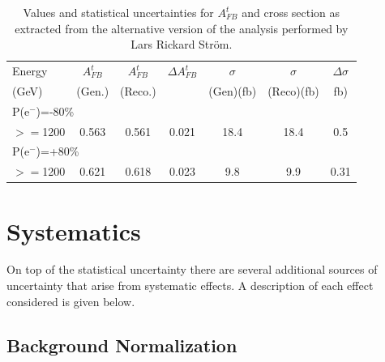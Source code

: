 \begin{table}
  \centering
  \begin{tabular}{l|c|c|c|c|c|c}
    \toprule
    Energy & $A_{FB}^t$ & $A_{FB}^t$  & $\Delta A^t_{FB}$ &  $\sigma$  &  $\sigma$  &  $\Delta\sigma$ \\
    (GeV) & (Gen.) & (Reco.) &  &  (Gen)(fb) &  (Reco)(fb) &  fb)\\
    \midrule
    \midrule
    \multicolumn{7}{l}{P(e$^-$)=-80\%} \\
    \midrule
    \midrule
    $>=$1200  & 0.563 & 0.561 & 0.021 & 18.4 & 18.4 & 0.5 \\
    \midrule
    \midrule
    \multicolumn{7}{l}{ P(e$^-$)=+80\%}\\
    \midrule
    \midrule
    $>=$1200  & 0.621 & 0.618 & 0.023 & 9.8 & 9.9 & 0.31 \\
    \bottomrule
  \end{tabular}
  \caption{Values and statistical uncertainties for $A_{FB}^t$ and cross section as extracted from the alternative version of the analysis performed by Lars Rickard Str{\"o}m.}
  \label{tab:RickardResults}
\end{table}

\section{Systematics}
\label{sec:topsystematics}

On top of the statistical uncertainty there are several additional sources of uncertainty that arise from systematic effects. A description of each effect considered is given below. 

\subsection{Background Normalization}

